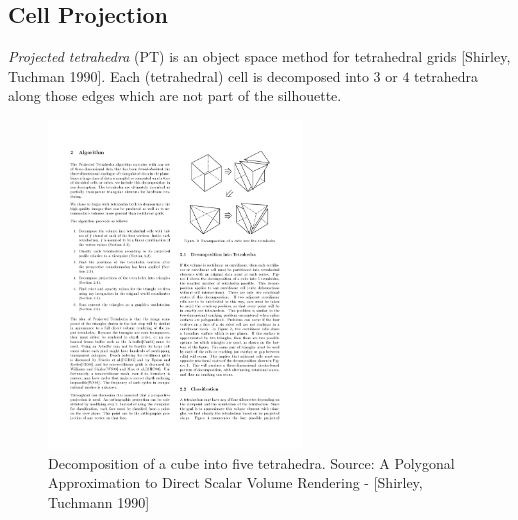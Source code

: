 \subsection{Cell Projection}
\emph{Projected tetrahedra} (PT) is an object space method for tetrahedral grids [Shirley, Tuchman 1990]. Each (tetrahedral) cell is decomposed into $3$ or $4$ tetrahedra along those edges which are not part of the silhouette.
\begin{figure}[H]
    \centering
    \includegraphics[width=0.6\textwidth]{img/04_cell_based_cropped}
        \caption{Decomposition of a cube into five tetrahedra. Source: A Polygonal Approximation to Direct Scalar Volume Rendering - [Shirley, Tuchmann 1990]}
\end{figure}


